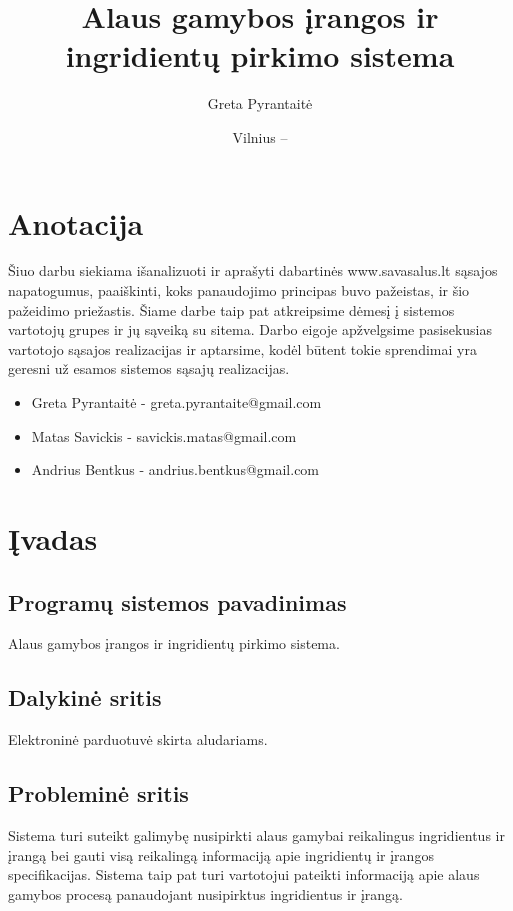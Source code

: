 \documentclass[oneside]{VUMIFPSkursinis}
\title{Alaus gamybos įrangos ir ingridientų pirkimo sistema}
\author{Greta Pyrantaitė}
\date{Vilnius – \the\year}
\begin{document}
\maketitle

\section{Anotacija}
Šiuo darbu siekiama išanalizuoti ir aprašyti dabartinės www.savasalus.lt sąsajos napatogumus, paaiškinti, koks panaudojimo principas buvo pažeistas, ir šio pažeidimo priežastis.
Šiame darbe taip pat atkreipsime dėmesį į sistemos vartotojų grupes ir jų sąveiką su sitema.
Darbo eigoje apžvelgsime pasisekusias vartotojo sąsajos realizacijas ir aptarsime, kodėl būtent tokie sprendimai yra geresni už esamos sistemos sąsajų realizacijas.

\begin{itemize}
	\item{Greta Pyrantaitė - greta.pyrantaite@gmail.com}
	\item{Matas Savickis - savickis.matas@gmail.com}
	\item{Andrius Bentkus - andrius.bentkus@gmail.com}
\end{itemize}

\tableofcontents

\section{Įvadas}
	\subsection{Programų sistemos pavadinimas}
		Alaus gamybos įrangos ir ingridientų pirkimo sistema.
	\subsection{Dalykinė sritis}
		Elektroninė parduotuvė skirta aludariams.
	\subsection{Probleminė sritis}
		Sistema turi suteikt galimybę nusipirkti alaus gamybai reikalingus ingridientus ir įrangą bei gauti visą reikalingą informaciją apie ingridientų ir įrangos specifikacijas.
		Sistema taip pat turi vartotojui pateikti informaciją apie alaus gamybos procesą panaudojant nusipirktus ingridientus ir įrangą.
\end{document}
